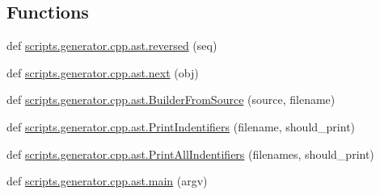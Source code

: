 \subsection*{Functions}
\begin{DoxyCompactItemize}
\item 
def \mbox{\hyperlink{namespacescripts_1_1generator_1_1cpp_1_1ast_add1e7c20fd903c40b7dd15e07e737390}{scripts.\+generator.\+cpp.\+ast.\+reversed}} (seq)
\item 
def \mbox{\hyperlink{namespacescripts_1_1generator_1_1cpp_1_1ast_a6a50e3014944e6bac6deb829291c988e}{scripts.\+generator.\+cpp.\+ast.\+next}} (obj)
\item 
def \mbox{\hyperlink{namespacescripts_1_1generator_1_1cpp_1_1ast_a6249ff8e5c3b3ccbe1f69b3e3b093b84}{scripts.\+generator.\+cpp.\+ast.\+Builder\+From\+Source}} (source, filename)
\item 
def \mbox{\hyperlink{namespacescripts_1_1generator_1_1cpp_1_1ast_a5f0475dec5be82258e6ef13b8e81005f}{scripts.\+generator.\+cpp.\+ast.\+Print\+Indentifiers}} (filename, should\+\_\+print)
\item 
def \mbox{\hyperlink{namespacescripts_1_1generator_1_1cpp_1_1ast_a80e2ba421a8cd55d9bd9d19aef9242f8}{scripts.\+generator.\+cpp.\+ast.\+Print\+All\+Indentifiers}} (filenames, should\+\_\+print)
\item 
def \mbox{\hyperlink{namespacescripts_1_1generator_1_1cpp_1_1ast_a74242c1ce0cfeae1923bc01e44c25b99}{scripts.\+generator.\+cpp.\+ast.\+main}} (argv)
\end{DoxyCompactItemize}
